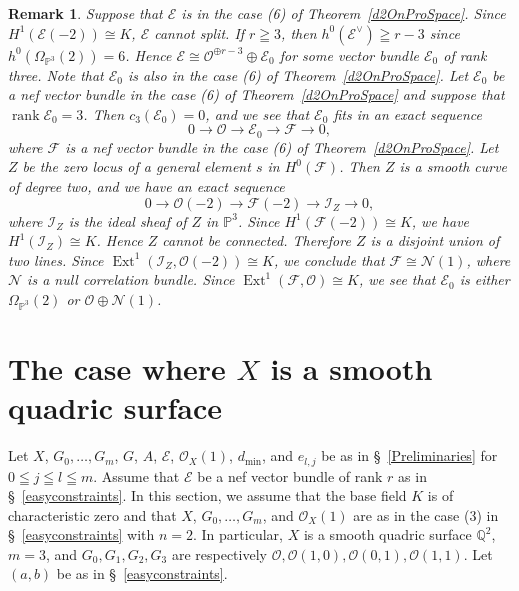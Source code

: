 \documentclass[a4paper,12pt]{amsart}
\newtheorem{rmk}[thm]{Remark}%
\DeclareMathOperator{\Ext}{Ext}
\DeclareMathOperator{\rk}{rank}
\begin{document}
\begin{rmk}
Suppose that $\mathcal{E}$ is in the case (6) of Theorem~\ref{d2OnProSpace}.
Since $H^1(\mathcal{E}(-2))\cong K$, $\mathcal{E}$ cannot split.
If $r\geqq 3$, then $h^0(\mathcal{E}^{\vee})\geqq r-3$ since $h^0(\Omega_{\mathbb{P}^3}(2))=6$.
Hence $\mathcal{E}\cong \mathcal{O}^{\oplus r-3}\oplus \mathcal{E}_0$
for some vector bundle $\mathcal{E}_0$ of rank three.
Note that $\mathcal{E}_0$ is also in the case (6) of Theorem~\ref{d2OnProSpace}.
Let $\mathcal{E}_0$ be a nef vector bundle in the case (6) of Theorem~\ref{d2OnProSpace}
and suppose that $\rk \mathcal{E}_0=3$. Then $c_3(\mathcal{E}_0)=0$,
and we see that $\mathcal{E}_0$ fits in an exact sequence
\[0\to \mathcal{O}\to \mathcal{E}_0\to \mathcal{F}\to 0,\]
where $\mathcal{F}$ is a nef vector bundle in the case (6) of Theorem~\ref{d2OnProSpace}.
Let $Z$ be the zero locus of a general element $s$ in $H^0(\mathcal{F})$.
Then $Z$ is a smooth curve of degree two, and we have an exact sequence
\[
0\to \mathcal{O}(-2)\to \mathcal{F}(-2)\to \mathcal{I}_Z\to 0,
\]
where $\mathcal{I}_Z$ is the ideal sheaf of $Z$ in $\mathbb{P}^3$.
Since $H^1(\mathcal{F}(-2))\cong K$, we have $H^1(\mathcal{I}_Z)\cong K$.
Hence $Z$ cannot be connected. Therefore $Z$ is a disjoint union of two lines.
Since $\Ext^1(\mathcal{I}_Z,\mathcal{O}(-2))\cong K$, we conclude that $\mathcal{F}
\cong \mathcal{N}(1)$, where $\mathcal{N}$ is a null correlation bundle.
Since $\Ext^1(\mathcal{F},\mathcal{O})\cong K$, we see that $\mathcal{E}_0$
is either $\Omega_{\mathbb{P}^3}(2)$ or $\mathcal{O}\oplus \mathcal{N}(1)$.
\end{rmk}

\section{The case where $X$ is a smooth quadric surface}
Let $X$, $G_0,\dots,G_m$, 
$G$,
$A$,
$\mathcal{E}$, $\mathcal{O}_X(1)$,
$d_{\min}$, 
and 
$e_{l,j}$
be as in \S~\ref{Preliminaries}
for $0\leqq j\leqq l\leqq m$.
Assume that $\mathcal{E}$ be a nef vector bundle of rank $r$ as in \S~\ref{easyconstraints}.
In this section, we assume 
that the base field $K$ is of characteristic zero
and that $X$, $G_0,\dots,G_m$, and $\mathcal{O}_X(1)$ are as in the case (3) in \S~\ref{easyconstraints}
with $n=2$.
In particular, $X$ is a smooth quadric surface $\mathbb{Q}^2$,
$m=3$, and $G_0,G_1,G_2,G_3$ are respectively $\mathcal{O},\mathcal{O}(1,0),\mathcal{O}(0,1), \mathcal{O}(1,1)$.
Let $(a,b)$ be as in \S~\ref{easyconstraints}. 
\end{document}
